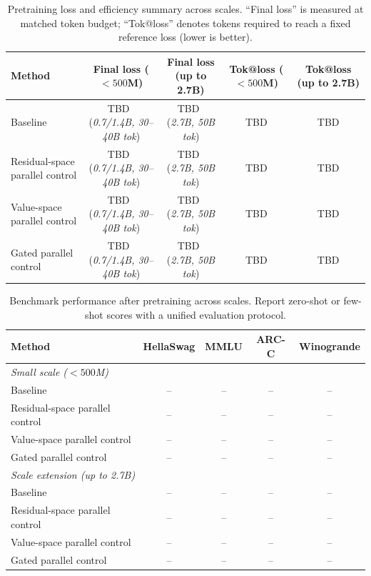 \begin{table}[t]
  \caption{Pretraining loss and efficiency summary across scales.
  ``Final loss'' is measured at matched token budget; ``Tok@loss'' denotes
  tokens required to reach a fixed reference loss (lower is better).}
  \label{tab:pretrain-loss-main}
  \centering
  \small
  \begin{tabular}{lcccc}
    \toprule
    Method & Final loss ($<500$M) & Final loss (up to 2.7B) & Tok@loss ($<500$M) & Tok@loss (up to 2.7B) \\
    \midrule
    Baseline & TBD \,(\textit{0.7/1.4B, 30--40B tok}) & TBD \,(\textit{2.7B, 50B tok}) & TBD & TBD \\
    Residual-space parallel control & TBD \,(\textit{0.7/1.4B, 30--40B tok}) & TBD \,(\textit{2.7B, 50B tok}) & TBD & TBD \\
    Value-space parallel control & TBD \,(\textit{0.7/1.4B, 30--40B tok}) & TBD \,(\textit{2.7B, 50B tok}) & TBD & TBD \\
    Gated parallel control & TBD \,(\textit{0.7/1.4B, 30--40B tok}) & TBD \,(\textit{2.7B, 50B tok}) & TBD & TBD \\
    \bottomrule
  \end{tabular}
\end{table}

\begin{table}[t]
  \caption{Benchmark performance after pretraining across scales.
  Report zero-shot or few-shot scores with a unified evaluation protocol.}
  \label{tab:pretrain-benchmark-main}
  \centering
  \small
  \begin{tabular}{lcccc}
    \toprule
    Method & HellaSwag & MMLU & ARC-C & Winogrande \\
    \midrule
    \multicolumn{5}{l}{\textit{Small scale ($<500$M)}} \\
    Baseline & -- & -- & -- & -- \\
    Residual-space parallel control & -- & -- & -- & -- \\
    Value-space parallel control & -- & -- & -- & -- \\
    Gated parallel control & -- & -- & -- & -- \\
    \midrule
    \multicolumn{5}{l}{\textit{Scale extension (up to 2.7B)}} \\
    Baseline & -- & -- & -- & -- \\
    Residual-space parallel control & -- & -- & -- & -- \\
    Value-space parallel control & -- & -- & -- & -- \\
    Gated parallel control & -- & -- & -- & -- \\
    \bottomrule
  \end{tabular}
\end{table}

